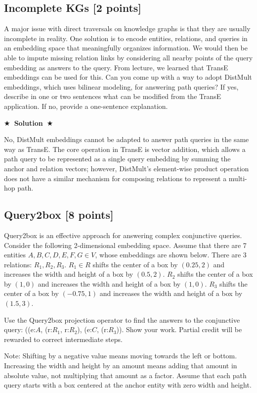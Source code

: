 \documentclass{article}
\numberwithin{figure}{section}
\newcommand{\Solution}[1]{%
    {%
        \medskip
        \color{red}
        \bf $\bigstar$~\sf\textbf{Solution}~$\bigstar$ \sf
        #1
    }
    \bigskip
}
\begin{document}
\subsection{Incomplete KGs [2 points]}
A major issue with direct traversals on knowledge graphs is that they are usually incomplete in reality. One solution is to encode entities, relations, and queries in an embedding space that meaningfully organizes information. We would then be able to impute missing relation links by considering all nearby points of the query embedding as answers to the query. From lecture, we learned that TransE embeddings can be used for this. Can you come up with a way to adopt DistMult embeddings, which uses bilinear modeling, for answering path queries? If yes, describe in one or two sentences what can be modified from the TransE application. If no, provide a one-sentence explanation.

\Solution{
	No, DistMult embeddings cannot be adapted to answer path queries in the same way as TransE. The core operation in TransE is vector addition, which allows a path query to be represented as a single query embedding by summing the anchor and relation vectors; however, DistMult's element-wise product operation does not have a similar mechanism for composing relations to represent a multi-hop path.
}


\subsection{Query2box [8 points]}

Query2box is an effective approach for answering complex conjunctive queries. Consider the following 2-dimensional embedding space. Assume that there are 7 entities $A, B, C, D, E, F, G \in V$, whose embeddings are shown below. There are 3 relations: $R_1, R_2, R_3$. $R_1 \in R$ shifts the center of a box by $(0.25, 2)$ and increases the width and height of a box by $(0.5, 2)$. $R_2$ shifts the center of a box by $(1, 0)$ and increases the width and height of a box by $(1, 0)$. $R_3$ shifts the center of a box by $(-0.75, 1)$ and increases the width and height of a box by $(1.5, 3)$.

Use the Query2box projection operator to find the answers to the conjunctive query: ((e:$A$, (r:$R_1$, r:$R_2$), (e:$C$, (r:$R_3$)). Show your work. Partial credit will be rewarded to correct intermediate steps.

Note: Shifting by a negative value means moving towards the left or bottom. Increasing the width and height by an amount means adding that amount in absolute value, not multiplying that amount as a factor. Assume that each path query starts with a box centered at the anchor entity with zero width and height.
\end{document}
